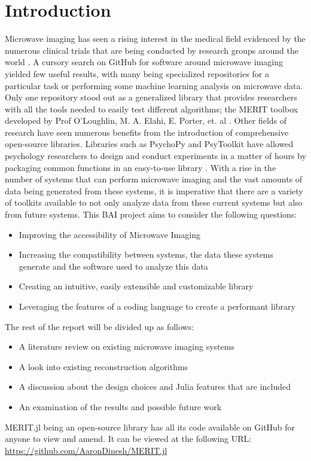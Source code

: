 \chapter*{Introduction}
Microwave imaging has seen a rising interest in the medical field evidenced by the numerous clinical trials that are
being conducted by research groups around the world \cite{preeceMARIAM4Clinical2016, moloneyWaveliaMicrowaveBreast2021,
e.c.fearMicrowaveBreastImaging2013}. A cursory search on GitHub for software around microwave imaging yielded few useful
results, with many being specialized repositories for a particular task or performing some machine learning analysis on
microwave data. Only one repository stood out as a generalized library that provides researchers with all the tools
needed to easily test different algorithms; the MERIT toolbox developed by Prof O'Loughlin, M. A. Elahi, E. Porter, et.
al \cite{d.oloughlinOpensourceSoftwareMicrowave2018}. Other fields of research have seen numerous benefits from the
introduction of comprehensive open-source libraries. Libraries such as PsychoPy and PsyToolkit have allowed psychology
researchers to design and conduct experiments in a matter of hours by packaging common functions in an easy-to-use
library \cite{stoetPsyToolkitTestimonials}. With a rise in the number of systems that can perform microwave imaging
and the vast amounts of data being generated from these systems, it is imperative that there are a variety of toolkits
available to not only analyze data from these current systems but also from future systems. This BAI project aims to
consider the following questions:
\begin{itemize}
    \item Improving the accessibility of Microwave Imaging
    \item Increasing the compatibility between systems, the data these systems generate and the software used to analyze
    this data
    \item Creating an intuitive, easily extensible and customizable library
    \item Leveraging the features of a coding language to create a performant library   
\end{itemize}
\hfill \break

The rest of the report will be divided up as follows:
\begin{itemize}
    \item A literature review on existing microwave imaging systems
    \item A look into existing reconstruction algorithms 
    \item A discussion about the design choices and Julia features that are included
    \item An examination of the results and possible future work
\end{itemize}

MERIT.jl being an open-source library has all its code available on GitHub for anyone to view and amend. It can be
viewed at the following URL: \url{https://github.com/AaronDinesh/MERIT.jl}
